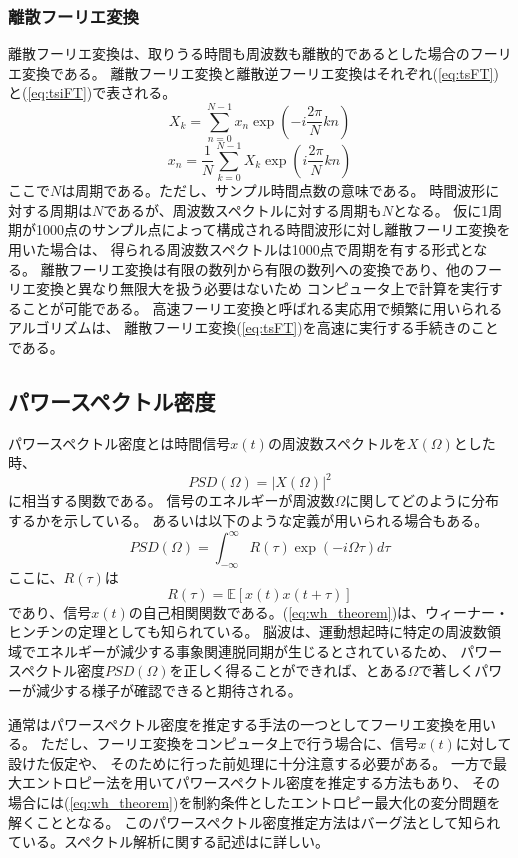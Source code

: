 \subsubsection{離散フーリエ変換}
離散フーリエ変換は、取りうる時間も周波数も離散的であるとした場合のフーリエ変換である。
離散フーリエ変換と離散逆フーリエ変換はそれぞれ(\ref{eq:tsFT})と(\ref{eq:tsiFT})で表される。
\begin{equation}
    X_k=\sum_{n = 0}^{N-1} x_n \exp \left(-i\frac{2\pi}{N} k n \right)
    \label{eq:tsFT}
\end{equation}
\begin{equation}
    x_n=\frac{1}{N}\sum_{k=0}^{N-1} X_k \exp \left(i \frac{2\pi}{N} k n \right)
    \label{eq:tsiFT}
\end{equation}
ここで\(N\)は周期である。ただし、サンプル時間点数の意味である。
時間波形に対する周期は\(N\)であるが、周波数スペクトルに対する周期も\(N\)となる。
仮に1周期が1000点のサンプル点によって構成される時間波形に対し離散フーリエ変換を用いた場合は、
得られる周波数スペクトルは1000点で周期を有する形式となる。
離散フーリエ変換は有限の数列から有限の数列への変換であり、他のフーリエ変換と異なり無限大を扱う必要はないため
コンピュータ上で計算を実行することが可能である。
高速フーリエ変換と呼ばれる実応用で頻繁に用いられるアルゴリズムは、
離散フーリエ変換(\ref{eq:tsFT})を高速に実行する手続きのことである。

\subsection{パワースペクトル密度}
パワースペクトル密度とは時間信号\(x(t)\)の周波数スペクトルを\(X(\Omega)\)とした時、
\begin{equation}
    PSD(\Omega)=|X(\Omega)|^2
\end{equation}
に相当する関数である。
信号のエネルギーが周波数\(\Omega\)に関してどのように分布するかを示している。
あるいは以下のような定義が用いられる場合もある。
\begin{equation}
    PSD(\Omega) = \int_{-\infty}^{\infty} R(\tau)\exp(-i\Omega \tau)d\tau
    \label{eq:wh_theorem}
\end{equation}
ここに、\(R(\tau)\)は
\begin{equation}
    R(\tau)  =  \mathbb E[x(t)x(t+\tau)]    
\end{equation}
であり、信号\(x(t)\)の自己相関関数である。(\ref{eq:wh_theorem})は、ウィーナー・ヒンチンの定理としても知られている。
脳波は、運動想起時に特定の周波数領域でエネルギーが減少する事象関連脱同期が生じるとされているため、
パワースペクトル密度\(PSD(\Omega)\)を正しく得ることができれば、とある\(\Omega\)で著しくパワーが減少する様子が確認できると期待される。

通常はパワースペクトル密度を推定する手法の一つとしてフーリエ変換を用いる。
ただし、フーリエ変換をコンピュータ上で行う場合に、信号\(x(t)\)に対して設けた仮定や、
そのために行った前処理に十分注意する必要がある。
一方で最大エントロピー法を用いてパワースペクトル密度を推定する方法もあり、
その場合には(\ref{eq:wh_theorem})を制約条件としたエントロピー最大化の変分問題を解くこととなる。
このパワースペクトル密度推定方法はバーグ法として知られている。スペクトル解析に関する記述は\cite{スペクトル解析}に詳しい。
